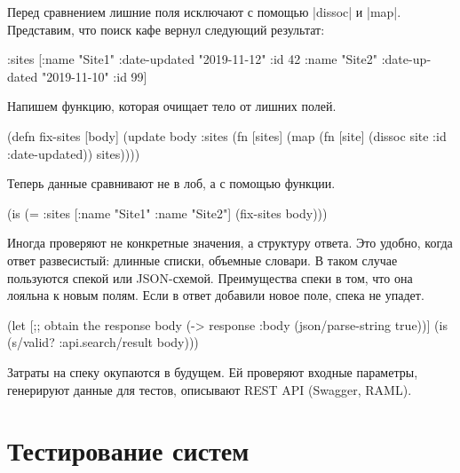 Перед сравнением лишние поля исключают с помощью \spverb|dissoc| и
\spverb|map|. Представим, что поиск кафе вернул следующий результат:

\begin{english}
  \begin{clojure}
{:sites [{:name "Site1" :date-updated "2019-11-12" :id 42}
         {:name "Site2" :date-updated "2019-11-10" :id 99}]}
  \end{clojure}
\end{english}

Напишем функцию, которая очищает тело от лишних полей.

\begin{english}
  \begin{clojure}
(defn fix-sites [body]
  (update body :sites
          (fn [sites]
            (map (fn [site]
                   (dissoc site :id :date-updated))
                 sites))))
  \end{clojure}
\end{english}

Теперь данные сравнивают не в лоб, а с помощью функции.

\begin{english}
  \begin{clojure}
(is (= {:sites [{:name "Site1"} {:name "Site2"}]}
       (fix-sites body)))
  \end{clojure}
\end{english}

Иногда проверяют не конкретные значения, а структуру ответа. Это удобно, когда
ответ развесистый: длинные списки, объемные словари. В таком случае пользуются
спекой или JSON-схемой. Преимущества спеки в том, что она лояльна к новым
полям. Если в ответ добавили новое поле, спека не упадет.

\begin{english}
  \begin{clojure}
(let [;; obtain the response
      body (-> response :body (json/parse-string true))]
  (is (s/valid? :api.search/result body)))
  \end{clojure}
\end{english}

Затраты на спеку окупаются в будущем. Ей проверяют входные параметры, генерируют
данные для тестов, описывают REST API (Swagger, RAML).

\section{Тестирование систем}

